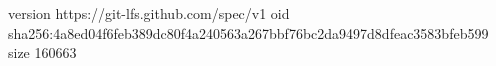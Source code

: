 version https://git-lfs.github.com/spec/v1
oid sha256:4a8ed04f6feb389dc80f4a240563a267bbf76bc2da9497d8dfeac3583bfeb599
size 160663
